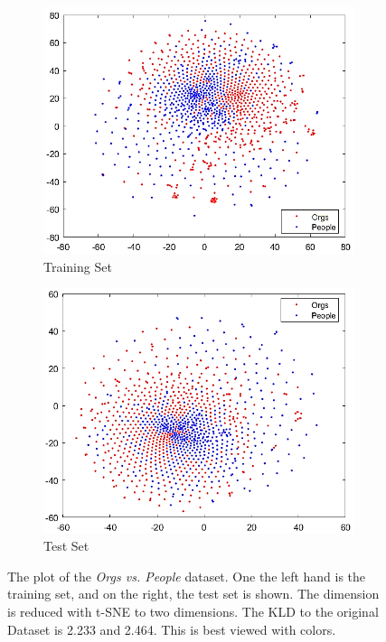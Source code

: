 \begin{figure}
	\centering
	\begin{subfigure}{.5\textwidth}
		\centering
		\includegraphics[width=1\linewidth]{figures/Plot_Train_OP_1.png}
		\caption{Training Set\label{FigOPSub1}}
	\end{subfigure}%
	\begin{subfigure}{.5\textwidth}
		\centering
		\includegraphics[width=1\linewidth]{figures/Plot_Test_OP_1.png}
		\caption{Test Set\label{FigOPSub2}}
	\end{subfigure}
	\caption[Plot of Orgs vs. People Dataset]{The plot of the \textit{Orgs vs. People} dataset. One the left hand is the training set, and on the right, the test set is shown. The dimension is reduced with t-SNE to two dimensions. The \acs{KLD} to the original Dataset is 2.233 and 2.464. This is best viewed with colors.\label{FigOrgVsPeoplePlot}}
\end{figure}


